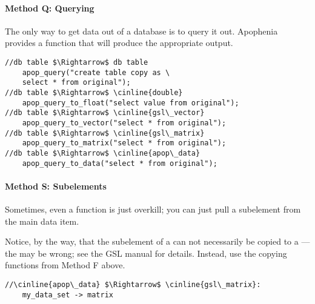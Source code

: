 \paragraph{Method Q: Querying}
 
 
The only way to get data out of a database is to query it out. Apophenia
provides a function that will produce the appropriate output.

\begin{lstlisting}
//db table $\Rightarrow$ db table
    apop_query("create table copy as \
    select * from original");
//db table $\Rightarrow$ \cinline{double}
    apop_query_to_float("select value from original");
//db table $\Rightarrow$ \cinline{gsl\_vector}
    apop_query_to_vector("select * from original");
//db table $\Rightarrow$ \cinline{gsl\_matrix}
    apop_query_to_matrix("select * from original");
//db table $\Rightarrow$ \cinline{apop\_data}
    apop_query_to_data("select * from original");
\end{lstlisting}


\paragraph{Method S: Subelements} Sometimes, even a function is just
overkill; you can just pull a subelement from the main data item.

Notice, by the way, that the  subelement of a
 can not necessarily be copied to a
---the  may be wrong; see the GSL manual
for details. Instead, use the copying functions from Method F above.

\begin{lstlisting}
//\cinline{apop\_data} $\Rightarrow$ \cinline{gsl\_matrix}:
    my_data_set -> matrix
\end{lstlisting}
\lstset{texcl=false}



